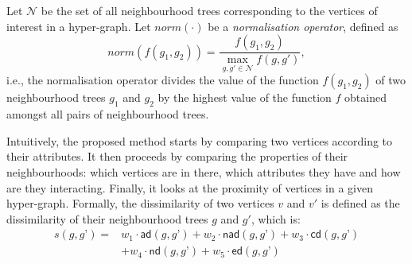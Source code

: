 Let $\mathcal{N}$ be the set of all neighbourhood trees corresponding to the vertices of interest in a hyper-graph.
Let $norm(\cdot)$ be a \textit{normalisation operator}, defined as $$norm(f(g_1,g_2)) = \frac{f(g_1,g_2)}{\underset{g,g' \in \mathcal{N}}{\max} f(g,g')},$$ i.e., the normalisation operator divides the value of the function $f(g_1,g_2)$ of two neighbourhood trees $g_1$ and $g_2$ by the highest value of the function $f$ obtained amongst all pairs of neighbourhood trees.



Intuitively, the proposed method starts by comparing two vertices according to their attributes.
It then proceeds by comparing the properties of their neighbourhoods: which vertices are in there, which attributes they have and how are they interacting.
Finally, it looks at the proximity of vertices in a given hyper-graph.
Formally, the dissimilarity of two vertices $v$ and $v'$ is defined as the dissimilarity of their neighbourhood trees $g$ and $g'$, which is:
\begin{equation}
\label{eq:Sim}
\begin{split}
s(g,g’) = & w_1 \cdot \mathsf{ad}(g,g’) + w_2 \cdot \mathsf{nad}(g,g’) + w_3 \cdot \mathsf{cd}(g,g’) \\
     & + w_4 \cdot \mathsf{nd}(g,g’) + w_5 \cdot \mathsf{ed}(g,g’)
 \end{split}
\end{equation}

